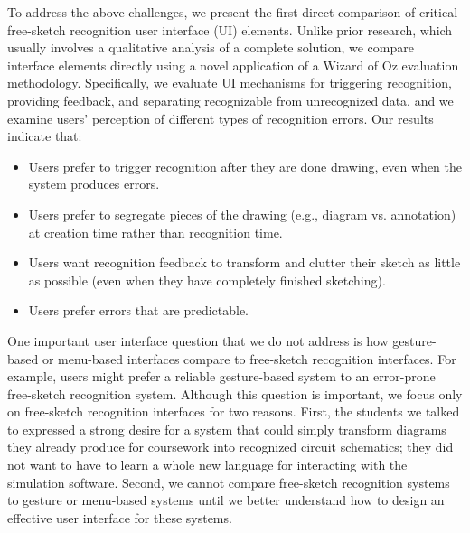 \documentclass{egpubl}
\begin{document}
To address the above challenges, we present the first direct
comparison of critical free-sketch recognition user interface (UI)
elements.  Unlike prior research, which usually involves a qualitative
analysis of a complete solution, we compare interface elements
directly using a novel application of a Wizard of Oz evaluation
methodology.  Specifically, we evaluate UI mechanisms for triggering
recognition, providing feedback, and separating recognizable from
unrecognized data, and we examine users' perception of different types
of recognition errors.  Our results indicate that:
\begin{itemize}
\item Users prefer to trigger recognition after they are done drawing,
  even when the system produces errors.
\item Users prefer to segregate pieces of the drawing (e.g., diagram
  vs. annotation) at creation time rather than recognition time.
\item Users want recognition feedback to transform and clutter their
  sketch as little as possible (even when they have completely finished sketching).
\item Users prefer errors that are predictable.
\end{itemize}



One important user interface question that we do not address is how
gesture-based or menu-based interfaces compare to free-sketch
recognition interfaces.  For example, users might prefer a reliable
gesture-based system to an error-prone free-sketch recognition system.
Although this question is important, we focus only on free-sketch
recognition interfaces for two reasons.  First, the students we talked
to expressed a strong desire for a system that could simply transform
diagrams they already produce for coursework into recognized circuit schematics;
they did not want to have to learn a whole new language for
interacting with the simulation software.  Second, we cannot compare
free-sketch recognition systems to gesture or menu-based systems until
we better understand how to design an effective user interface for
these systems.
\end{document}

